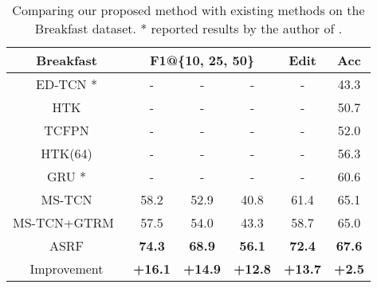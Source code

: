 \documentclass[10pt,twocolumn,letterpaper]{article}
\begin{document}
\begin{table}[t!]
\small
\centering
\begin{tabular}{cccccc}
\hline
Breakfast          & \multicolumn{3}{c}{F1@\{10, 25, 50\}} & Edit   & Acc   \\ \hline
ED-TCN \cite{tcn} *           & -          & -          & -          & -       & 43.3  \\ 
HTK \cite{htk}                & -          & -          & -          & -       & 50.7  \\ 
TCFPN \cite{softboundary}     & -          & -          & -          & -       & 52.0  \\ 
HTK(64) \cite{markov1}        & -          & -          & -          & -       & 56.3  \\ 
GRU \cite{softboundary} *     & -          & -          & -          & -       & 60.6  \\ 
MS-TCN \cite{mstcn}           & 58.2       & 52.9       & 40.8       & 61.4    & 65.1  \\ 
MS-TCN+GTRM~\cite{as_graph}   & 57.5       & 54.0       & 43.3       & 58.7    & 65.0     \\\hline
ASRF                          & \textbf{74.3}   & \textbf{68.9}   & \textbf{56.1}  &    \textbf{72.4} & \textbf{67.6}   \\ 
\rowcolor[gray]{0.90}
Improvement                   & \textbf{+16.1}       & \textbf{+14.9}    & \textbf{+12.8}   & \textbf{+13.7}  & \textbf{+2.5} \\ \hline
\end{tabular}
\caption{Comparing our proposed method with existing methods on the Breakfast dataset. * reported results by the author of \cite{softboundary}.}
\label{tab:breakfast}
\vspace{-10pt}
\end{table}
\end{document}
